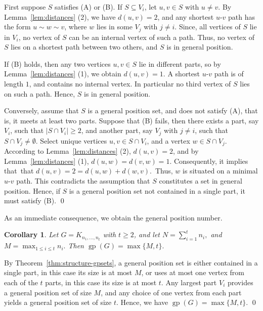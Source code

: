 \documentclass[12pt,twoside]{article}
\newtheorem{corollary}[theorem]{Corollary}
\renewenvironment{proof}{{\noindent\bfseries Proof.}}{\qed}
\begin{document}
	\begin{proof}
		First suppose \(S\) satisfies (A) or (B). If \(S\subseteq V_i\), let \(u,v\in S\) with \(u\neq v\). By Lemma~\ref{lem:distances} (2), we have \(d(u,v)=2\), and any shortest \(u\text{-}v\) path has the form \(u\sim w\sim v\), where \(w\) lies in some \(V_j\) with \(j\neq i\). Since, all vertices of \(S\) lie in \(V_i\), no vertex of \(S\) can be an internal vertex of such a path. Thus, no vertex of \(S\) lies on a shortest path between two others, and \(S\) is in general position.
		
		If (B) holds, then any two vertices \(u,v\in S\) lie in different parts, so by Lemma~\ref{lem:distances} (1), we obtain \(d(u,v)=1\). A shortest \(u\text{-}v\) path is of length \(1\), and contains no internal vertex. In particular no third vertex of \(S\) lies on such a path. Hence, \(S\) is in general position.
		
		Conversely, assume that \(S\) is a general position set, and does not satisfy (A), that is, it meets at least two parts. Suppose that (B) fails, then there exists a part, say \(V_i\), such that \(|S\cap V_i|\ge 2\), and another part, say \(V_j\) with \(j\neq i\), such that \(S\cap V_j\neq\emptyset\). Select unique vertices \(u,v\in S\cap V_i\), and a vertex \(w\in S\cap V_j\). According to Lemma~\ref{lem:distances} (2), \(d(u,v)=2\), and by Lemma~\ref{lem:distances} (1), \(d(u,w)=d(v,w)=1\). Consequently, it implies that that $d(u,v) = 2 = d(u,w) + d(w,v).$ Thus, \(w\) is situated on a minimal \(u\text{-}v\) path. This contradicts the assumption that \(S\) constitutes a set in general position. Hence, if \(S\) is a general position set not contained in a single part, it must satisfy (B).
	\end{proof}
	
	As an immediate consequence, we obtain the general position number.
	
	\begin{corollary}\label{cor:gp-number-multipartite}
		Let \(G=K_{n_1,\dots,n_t}\) with \(t\ge 2\), and let $N=\sum_{i=1}^t n_i,$ and $M=\max_{1\le i\le t} n_i.$ 	Then
		$\operatorname{gp}(G)=\max\{M,t\}.$ 
	\end{corollary}
	
	\begin{proof}
		By Theorem~\ref{thm:structure-gpsets}, a general position set is either contained in a single part, in this case its size is at most \(M\), or uses at most one vertex from each of the \(t\) parts, in this case its size is at most \(t\). Any largest part \(V_i\) provides a general position set of size \(M\), and any choice of one vertex from each part yields a general position set of size \(t\). Hence, we have \(\operatorname{gp}(G)=\max\{M,t\}\).
	\end{proof}
	
\end{document}
